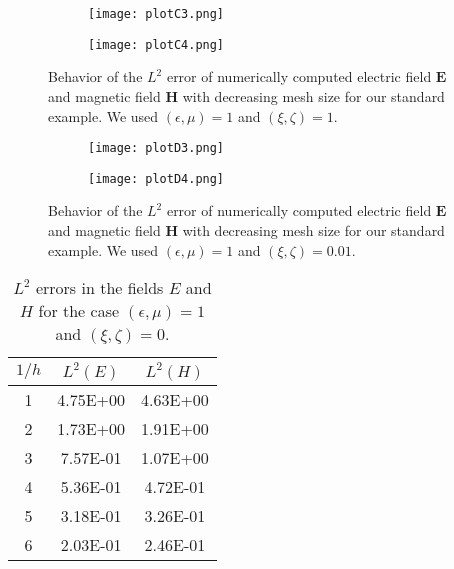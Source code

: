 \documentclass[journal,transmag]{IEEEtran}
\newcommand*\VF[1]{\mathbf{#1}}
\begin{document}
\begin{figure*} 
    \begin{subfigure}{.5\textwidth}
        \centering
        \texttt{[image: plotC3.png]}
        \label{fig:errorC:3}
    \end{subfigure}
    \begin{subfigure}{.5\textwidth}
        \centering
        \texttt{[image: plotC4.png]}\label{fig:errorC:4}
    \end{subfigure}
    \caption{Behavior of the $L^2$ error
    of numerically computed electric field $\VF{E}$ and magnetic field $\VF{H}$ with decreasing mesh size
    for our standard example.
    We used  $(\epsilon,\mu) = 1$ and $(\xi,\zeta) = 1$.}
    \label{fig:errorC}
\end{figure*}



\begin{figure*} 
    \begin{subfigure}{.5\textwidth}
        \centering
        \texttt{[image: plotD3.png]}
        \label{fig:errorD:3}
    \end{subfigure}
    \begin{subfigure}{.5\textwidth}
        \centering
        \texttt{[image: plotD4.png]}\label{fig:errorD:4}
    \end{subfigure}
    \caption{Behavior of the $L^2$ error
    of numerically computed electric field $\VF{E}$ and magnetic field $\VF{H}$ with decreasing mesh size
    for our standard example.
    We used  $(\epsilon,\mu) = 1$ and $(\xi,\zeta) = 0.01$.}
    \label{fig:errorD}
\end{figure*}







\begin{table}[]
\centering
    \begin{tabular}{|c|c|c|}
        \hline
        $1/h$ & $L^2(E)$ & $L^2(H)$ \\ \hline
        1     & 4.75E+00 & 4.63E+00 \\ \hline
        2     & 1.73E+00 & 1.91E+00 \\ \hline
        3     & 7.57E-01 & 1.07E+00 \\ \hline
        4     & 5.36E-01 & 4.72E-01 \\ \hline
        5     & 3.18E-01 & 3.26E-01 \\ \hline
        6     & 2.03E-01 & 2.46E-01 \\ \hline
    \end{tabular}
    \caption{$L^2$ errors in the fields $E$ and $H$ for the case $(\epsilon,\mu) = 1$ and $(\xi,\zeta) = 0$.}
    \label{tab:case1}
    \end{table}
    
\end{document}
